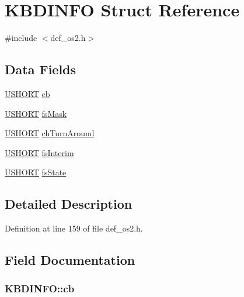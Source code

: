 \hypertarget{structKBDINFO}{\section{K\+B\+D\+I\+N\+F\+O Struct Reference}
\label{structKBDINFO}
}


{\ttfamily \#include $<$def\+\_\+os2.\+h$>$}

\subsection*{Data Fields}
\begin{DoxyCompactItemize}
\item 
\hyperlink{def__os2_8h_a5850d5316caf7f4cedd742fdf8cd7c02}{U\+S\+H\+O\+R\+T} \hyperlink{structKBDINFO_ae2979de13427e213e303194d67ffda4e}{cb}
\item 
\hyperlink{def__os2_8h_a5850d5316caf7f4cedd742fdf8cd7c02}{U\+S\+H\+O\+R\+T} \hyperlink{structKBDINFO_a591037a8e9b6507d57c532a332b919a5}{fs\+Mask}
\item 
\hyperlink{def__os2_8h_a5850d5316caf7f4cedd742fdf8cd7c02}{U\+S\+H\+O\+R\+T} \hyperlink{structKBDINFO_a08d50861a69bcf4007ef1af2a53d4469}{ch\+Turn\+Around}
\item 
\hyperlink{def__os2_8h_a5850d5316caf7f4cedd742fdf8cd7c02}{U\+S\+H\+O\+R\+T} \hyperlink{structKBDINFO_aa68a672490ccdb771add54bf340205b9}{fs\+Interim}
\item 
\hyperlink{def__os2_8h_a5850d5316caf7f4cedd742fdf8cd7c02}{U\+S\+H\+O\+R\+T} \hyperlink{structKBDINFO_a0772532c2e0c2ea7f3f4f1a42bd32f5e}{fs\+State}
\end{DoxyCompactItemize}


\subsection{Detailed Description}


Definition at line 159 of file def\+\_\+os2.\+h.



\subsection{Field Documentation}
\hypertarget{structKBDINFO_ae2979de13427e213e303194d67ffda4e}{
\subsubsection[{cb}]{ K\+B\+D\+I\+N\+F\+O\+::cb}}\label{structKBDINFO_ae2979de13427e213e303194d67ffda4e}


